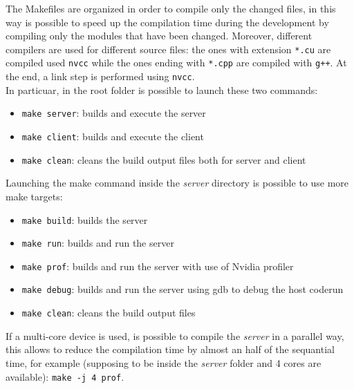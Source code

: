 \documentclass[paper=a4, fontsize=10pt]{scrartcl}	%
\begin{document}
	The Makefiles are organized in order to compile only the changed files, in this way is possible to speed up the compilation time during the development by compiling only the modules that have been changed. Moreover, different compilers are used for different source files: the ones with extension \texttt{*.cu} are compiled used \texttt{nvcc} while the ones ending with \texttt{*.cpp} are compiled with \texttt{g++}. At the end, a link step is performed using \texttt{nvcc}.\\
	
	In particuar, in the root folder is possible to launch these two commands:

	\begin{itemize}
		\item \texttt{make server}: builds and execute the server
		\item \texttt{make client}: builds and execute the client
		\item \texttt{make clean}: cleans the build output files both for server and client
	\end{itemize}

	Launching the make command inside the \textit{server} directory is possible to use more make targets:

	\begin{itemize}
		\item \texttt{make build}: builds the server
		\item \texttt{make run}: builds and run the server
		\item \texttt{make prof}: builds and run the server with use of Nvidia profiler
		\item \texttt{make debug}: builds and run the server using gdb to debug the host coderun
		\item \texttt{make clean}: cleans the build output files
	\end{itemize}

	If a multi-core device is used, is possible to compile the \textit{server} in a parallel way, this allows to reduce the compilation time by almost an half of the sequantial time, for example (supposing to be inside the \textit{server} folder and 4 cores are available): \texttt{make -j 4 prof}.\\
\end{document}
